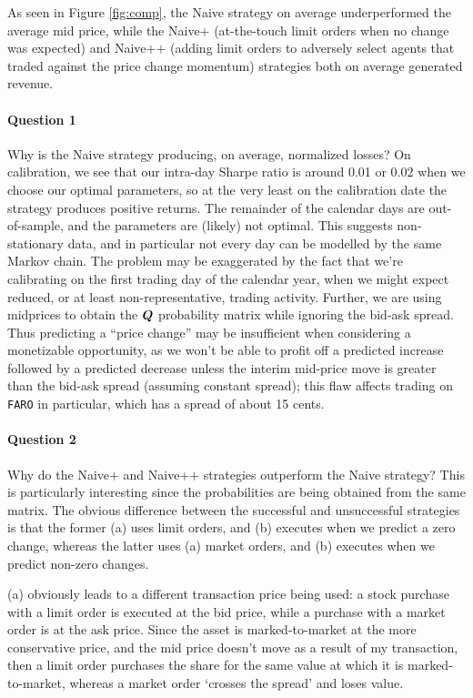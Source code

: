 As seen in Figure \ref{fig:comp}, the Naive strategy on average underperformed the average mid price, while the Naive+ (at-the-touch limit orders when no change was expected) and Naive++ (adding limit orders to adversely select agents that traded against the price change momentum) strategies both on average generated revenue.

\paragraph{Question 1} Why is the Naive strategy producing, on average, normalized losses? On calibration, we see that our intra-day Sharpe ratio is around 0.01 or 0.02 when we choose our optimal parameters, so at the very least on the calibration date the strategy produces positive returns. The remainder of the calendar days are out-of-sample, and the parameters are (likely) not optimal. This suggests non-stationary data, and in particular not every day can be modelled by the same Markov chain. The problem may be exaggerated by the fact that we're calibrating on the first trading day of the calendar year, when we might expect reduced, or at least non-representative, trading activity. Further, we are using midprices to obtain the $\boldsymbol{Q}$ probability matrix while ignoring the bid-ask spread. Thus predicting a ``price change'' may be insufficient when considering a monetizable opportunity, as we won't be able to profit off a predicted increase followed by a predicted decrease unless the interim mid-price move is greater than the bid-ask spread (assuming constant spread); this flaw affects trading on \texttt{FARO} in particular, which has a spread of about 15 cents.

\paragraph{Question 2} Why do the Naive+ and Naive++ strategies outperform the Naive strategy? This is particularly interesting since the probabilities are being obtained from the same matrix. The obvious difference between the successful and unsuccessful strategies is that the former (a) uses limit orders, and (b) executes when we predict a zero change, whereas the latter uses (a) market orders, and (b) executes when we predict non-zero changes.

(a) obviously leads to a different transaction price being used: a stock purchase with a limit order is executed at the bid price, while a purchase with a market order is at the ask price. Since the asset is marked-to-market at the more conservative price, and the mid price doesn't move as a result of my transaction, then a limit order purchases the share for the same value at which it is marked-to-market, whereas a market order `crosses the spread' and loses value.

